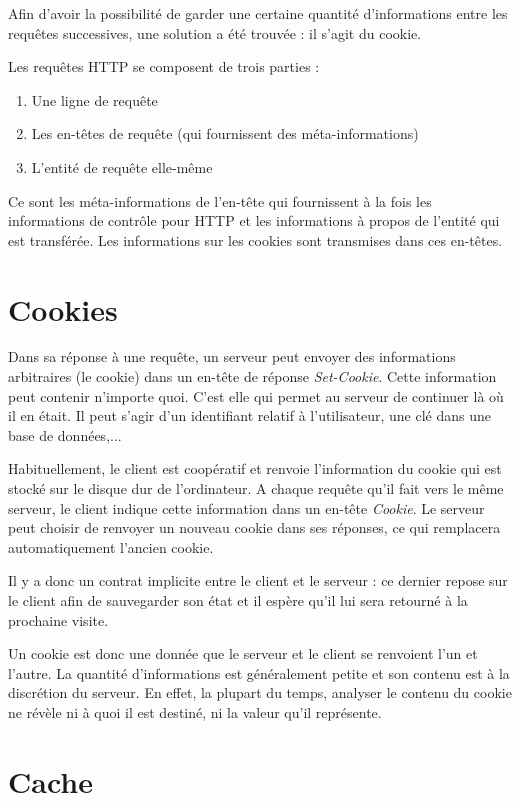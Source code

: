 \documentclass[a4paper,12pt,french]{report}
\begin{document}
Afin d'avoir la possibilité de garder une certaine quantité d'informations entre les requêtes successives, une solution a été trouvée : il s'agit du cookie.

Les requêtes HTTP se composent de trois parties :
\begin{enumerate}
	\item Une ligne de requête
	\item Les en-têtes de requête (qui fournissent des méta-informations)
	\item L'entité de requête elle-même
\end{enumerate}

Ce sont les méta-informations de l'en-tête qui fournissent à la fois les informations de contrôle pour HTTP et les informations à propos de l'entité qui est transférée. Les informations sur les cookies sont transmises dans ces en-têtes.
	
\section{Cookies}
Dans sa réponse à une requête, un serveur peut envoyer des informations arbitraires (le cookie) dans un en-tête de réponse \textit{Set-Cookie}. Cette information peut contenir n'importe quoi. C'est elle qui permet au serveur de continuer là où il en était. Il peut s'agir d'un identifiant relatif à l'utilisateur, une clé dans une base de données,...

Habituellement, le client est coopératif et renvoie l'information du cookie qui est stocké sur le disque dur de l'ordinateur. A chaque requête qu'il fait vers le même serveur, le client indique cette information dans un en-tête \textit{Cookie}. Le serveur peut choisir de renvoyer un nouveau cookie dans ses réponses, ce qui remplacera automatiquement l'ancien cookie.

Il y a donc un contrat implicite entre le client et le serveur : ce dernier repose sur le client afin de sauvegarder son état et il espère qu'il lui sera retourné à la prochaine visite.

Un cookie est donc une donnée que le serveur et le client se renvoient l'un et l'autre. La quantité d'informations est généralement petite et son contenu est à la discrétion du serveur. En effet, la plupart du temps, analyser le contenu du cookie ne révèle ni à quoi il est destiné, ni la valeur qu'il représente.

\section{Cache}
\end{document}
